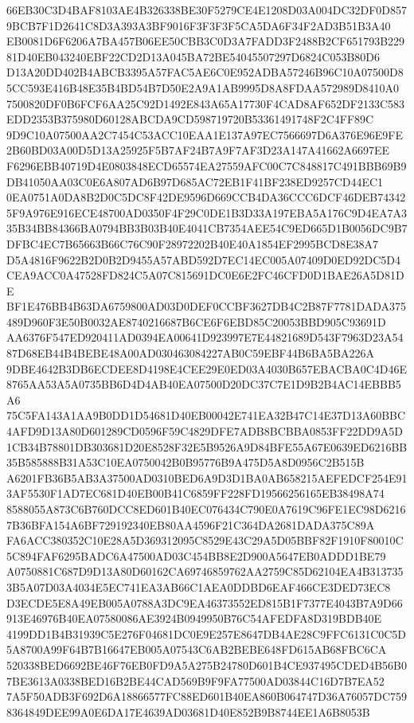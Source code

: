 \documentclass[UTF8,fontset=fandol,zihao=-4,a4paper]{ctexart}
\begin{document}
{{66EB30C3D4BAF8103AE4B326338BE30F5279CE4E1208D03A004DC32DF0D8579BCB7F1D2641C8D3A393A3BF9016F3F3F3F5CA5DA6F34F2AD3B51B3A40
EB0081D6F6206A7BA457B06EE50CBB3C0D3A7FADD3F2488B2CF651793B22981D40EB043240EBF22CD2D13A045BA72BE54045507297D6824C053B80D6
D13A20DD402B4ABCB3395A57FAC5AE6C0E952ADBA57246B96C10A07500D85CC593E416B48E35B4BD54B7D50E2A9A1AB9995D8A8FDAA572989D8410A0
7500820DF0B6FCF6AA25C92D1492E843A65A17730F4CAD8AF652DF2133C583EDD2353B375980D60128ABCDA9CD598719720B53361491748F2C4FF89C
9D9C10A07500AA2C7454C53ACC10EAA1E137A97EC7566697D6A376E96E9FE2B60BD03A00D5D13A25925F5B7AF24B7A9F7AF3D23A147A41662A6697EE
F6296EBB40719D4E0803848ECD65574EA27559AFC00C7C848817C491BBB69B9DB41050AA03C0E6A807AD6B97D685AC72EB1F41BF238ED9257CD44EC1
0EA0751A0DA8B2D0C5DC8F42DE9596D669CCB4DA36CCC6DCF46DEB743425F9A976E916ECE48700AD0350F4F29C0DE1B3D33A197EBA5A176C9D4EA7A3
35B34BB84366BA0794BB3B03B40E4041CB7354AEE54C9ED665D1B0056DC9B7DFBC4EC7B65663B66C76C90F28972202B40E40A1854EF2995BCD8E38A7
D5A4816F9622B2D0B2D9455A57ABD592D7EC14EC005A07409D0ED92DC5D4CEA9ACC0A47528FD824C5A07C815691DC0E6E2FC46CFD0D1BAE26A5D81DE
BF1E476BB4B63DA6759800AD03D0DEF0CCBF3627DB4C2B87F7781DADA375489D960F3E50B0032AE8740216687B6CE6F6EBD85C20053BBD905C93691D
AA6376F547ED920411AD0394EA00641D923997E7E44821689D543F7963D23A5487D68EB44B4BEBE48A00AD030463084227AB0C59EBF44B6BA5BA226A
9DBE4642B3DB6ECDEE8D4198E4CEE29E0ED03A4030B657EBACBA0C4D46E8765AA53A5A0735BB6D4D4AB40EA07500D20DC37C7E1D9B2B4AC14EBBB5A6
75C5FA143A1AA9B0DD1D54681D40EB00042E741EA32B47C14E37D13A60BBC4AFD9D13A80D601289CD0596F59C4829DFE7ADB8BCBBA0853FF22DD9A5D
1CB34B78801DB303681D20E8528F32E5B9526A9D84BFE55A67E0639ED6216BB35B585888B31A53C10EA0750042B0B95776B9A475D5A8D0956C2B515B
A6201FB36B5AB3A37500AD0310BED6A9D3D1BA0AB658215AEFEDCF254E913AF5530F1AD7EC681D40EB00B41C6859FF228FD19566256165EB38498A74
8588055A873C6B760DCC8ED601B40EC076434C790E0A7619C96FE1EC98D62167B36BFA154A6BF729192340EB80AA4596F21C364DA2681DADA375C89A
FA6ACC380352C10E28A5D369312095C8529E43C29A5D05BBF82F1910F80010C5C894FAF6295BADC6A47500AD03C454BB8E2D900A5647EB0ADDD1BE79
A0750881C687D9D13A80D60162CA69746859762AA2759C85D62104EA4B3137353B5A07D03A4034E5EC741EA3AB66C1AEA0DDBD6EAF466CE3DED73EC8
D3ECDE5E8A49EB005A0788A3DC9EA46373552ED815B1F7377E4043B7A9D66913E46976B40EA07580086AE3924B0949950B76C54AFEDFA8D319BDB40E
4199DD1B4B31939C5E276F04681DC0E9E257E8647DB4AE28C9FFC6131C0C5D5A8700A99F64B7B16647EB005A07543C6AB2BEBE648FD615AB68FBC6CA
520338BED6692BE46F76EB0FD9A5A275B24780D601B4CE937495CDED4B56B07BE3613A0338BED16B2BE44CAD569B9F9FA77500AD03844C16D7B7EA52
7A5F50ADB3F692D6A18866577FC88ED601B40EA860B064747D36A76057DC7598364849DEE99A0E6DA17E4639AD03681D40E852B9B8744EE1A6B8053B
}}
\end{document}
